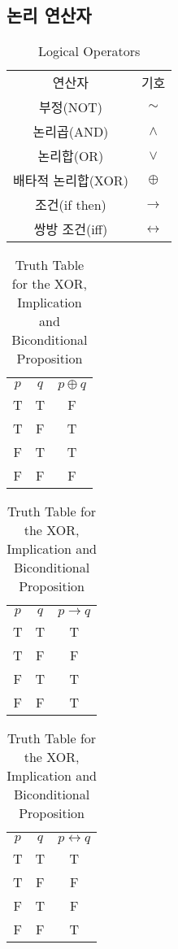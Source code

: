 \subsection{논리 연산자}
\begin{table}[]
    \begin{minipage}{\linewidth}
        \caption {Logical Operators}
        \centering
        \begin{tabular}[1.5]{c|c}
        연산자      & 기호\\
        \Xhline{3\arrayrulewidth}
        부정(NOT)  & $\sim$\\
        \hline
        논리곱(AND) & $\land$\\
        \hline
        논리합(OR)  & $\lor$\\
        \hline
        배타적 논리합(XOR)&$\oplus$\\
        \hline
        조건(if then)&$\to$\\
        \hline
        쌍방 조건(iff)&$\leftrightarrow$
        \end{tabular}
    \end{minipage}
\end{table}
\begin{table}[]
    \caption {Truth Table for the XOR, Implication and Biconditional Proposition}
    \begin{minipage}{.33\linewidth}
        \centering
        \begin{tabular}[1.5]{cc|c}
        $p$&$q$&$p\oplus q$\\
        \Xhline{3\arrayrulewidth}
        T&T&F\\
        T&F&T\\
        F&T&T\\
        F&F&F
        \end{tabular}
    \end{minipage}
    \begin{minipage}{.33\linewidth}
        \centering
        \begin{tabular}[1.5]{cc|c}
        $p$&$q$&$p\to q$\\
        \Xhline{3\arrayrulewidth}
        T&T&T\\
        T&F&F\\
        F&T&T\\
        F&F&T
        \end{tabular}
    \end{minipage}
    \begin{minipage}{.33\linewidth}
        \centering
        \begin{tabular}[1.5]{cc|c}
        $p$&$q$&$p\leftrightarrow q$\\
        \Xhline{3\arrayrulewidth}
        T&T&T\\
        T&F&F\\
        F&T&F\\
        F&F&T
        \end{tabular}
    \end{minipage}
\end{table}
